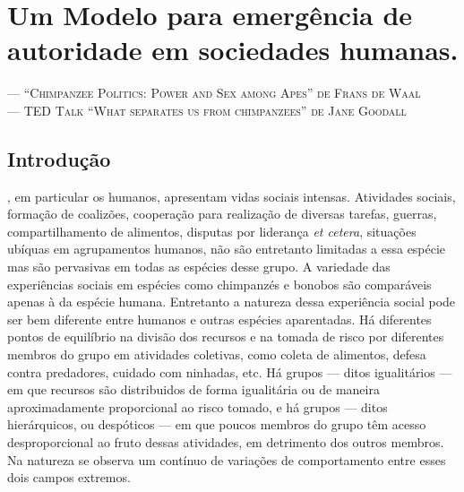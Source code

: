 \chapter{Um Modelo para emergência de autoridade em sociedades humanas.}
\begin{epigraphs}
 {\---- \textsc{``Chimpanzee Politics: Power and Sex among Apes'' de Frans de Waal\citep{deWaal2007}}}
 \\[2ex]
 {\---- \textsc{TED Talk ``What separates us from chimpanzees'' de Jane Goodall\citep{Goodall2002}}}
\end{epigraphs}	

\label{ch:autoridade}
\section{Introdução}

, em particular os humanos, apresentam vidas sociais intensas. Atividades sociais, formação de coalizões, cooperação para realização de diversas tarefas, guerras, compartilhamento de alimentos, disputas por liderança \textit{et cetera}, situações ubíquas em agrupamentos humanos, não são entretanto limitadas a essa espécie mas são pervasivas em todas as espécies desse grupo. A variedade das experiências sociais em espécies como chimpanzés e bonobos são comparáveis apenas à da espécie humana\cite[-3.2cm]{deWaal2007, deWaal1990}. Entretanto a natureza dessa experiência social pode ser bem diferente entre humanos e outras espécies aparentadas. Há diferentes pontos de equilíbrio na divisão dos recursos e na tomada de risco por diferentes membros do grupo em atividades coletivas, como coleta de alimentos, defesa contra predadores, cuidado com ninhadas, etc\cite{Vehrencamp1983,Boehm2001}. Há grupos --- ditos igualitários --- em que recursos são distribuidos de forma igualitária ou de maneira aproximadamente proporcional ao risco tomado, e há grupos --- ditos hierárquicos, ou despóticos --- em que poucos membros do grupo têm acesso desproporcional ao fruto dessas atividades, em detrimento dos outros membros. Na natureza se observa um contínuo de variações de comportamento entre esses dois campos extremos. 

